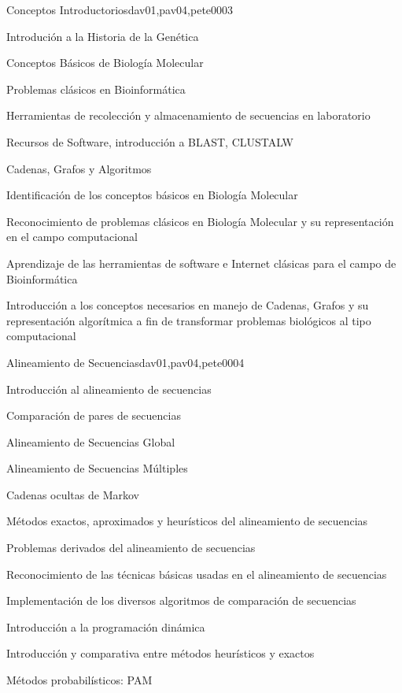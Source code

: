 \begin{syllabus}
\begin{unit}{Conceptos Introductorios}{dav01,pav04,pete00}{0}{3}
\begin{topics}
        \item Introdución a la Historia de la Genética
        \item Conceptos Básicos de Biología Molecular
        \item Problemas clásicos en Bioinformática
        \item Herramientas de recolección y almacenamiento de secuencias en laboratorio
        \item Recursos de Software, introducción a BLAST, CLUSTALW
        \item Cadenas, Grafos y Algoritmos
    \end{topics}
    \begin{unitgoals}
        \item Identificación de los conceptos básicos en Biología Molecular
        \item Reconocimiento de problemas clásicos en Biología Molecular y su representación en el campo computacional
        \item Aprendizaje de las herramientas de software e Internet clásicas para el campo de Bioinformática
        \item Introducción a los conceptos necesarios en manejo de Cadenas, Grafos y su representación algorítmica a fin de transformar problemas biológicos al tipo computacional
    \end{unitgoals}
\end{unit}

\begin{unit}{Alineamiento de Secuencias}{dav01,pav04,pete00}{0}{4}
\begin{topics}
        \item Introducción al alineamiento de secuencias
        \item Comparación de pares de secuencias
        \item Alineamiento de Secuencias Global
        \item Alineamiento de Secuencias Múltiples
        \item Cadenas ocultas de Markov
        \item Métodos exactos, aproximados y heurísticos del alineamiento de secuencias
        \item Problemas derivados del alineamiento de secuencias
    \end{topics}
    \begin{unitgoals}
        \item Reconocimiento de las técnicas básicas usadas en el alineamiento de secuencias
        \item Implementación de los diversos algoritmos de comparación de secuencias
        \item Introducción a la programación dinámica
        \item Introducción y comparativa entre métodos heurísticos y exactos
        \item Métodos probabilísticos: PAM
    \end{unitgoals}
\end{unit}


\end{syllabus}
